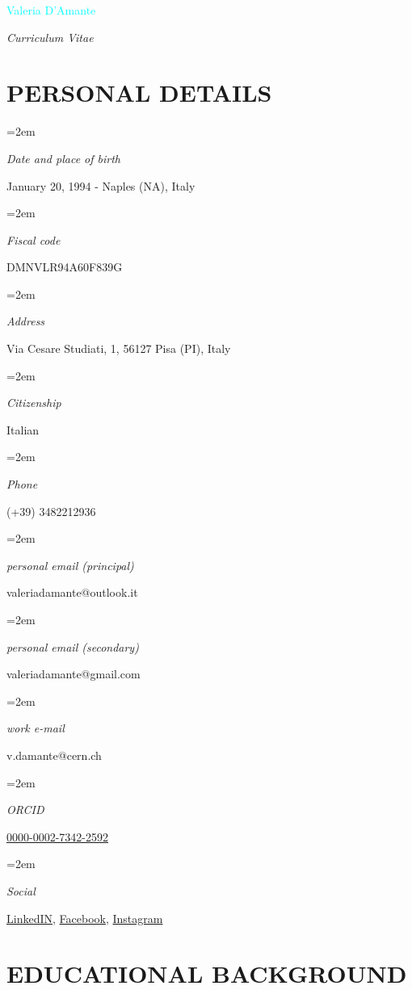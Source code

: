\documentclass[fontsize=12pt]{article} %
\newlength{\spacebox}
\newcommand{\MyName}[1]{ %
	\Huge \hfill \textcolor{cyan}{#1}
	\par \normalsize \normalfont}
\newcommand{\MySlogan}[1]{ %
	\large \hfill \textit{#1}
	\par \normalsize \normalfont}
\newcommand{\NewPart}[1]{\section*{\uppercase{#1}}}
\newcommand{\PersonalEntry}[2]{
	\noindent\hangindent=2em\hangafter=0 %
	\vspace{0.7em}
	\parbox{\spacebox}{        %
		\footnotesize{\textit{#1}}}		       %
	\hspace{1.3em} #2 \par}    %
\begin{document}
	\MyName{Valeria D'Amante}
	\MySlogan{Curriculum Vitae}




	\NewPart{Personal details}
	\PersonalEntry{Date and place of birth}{January 20, 1994 {-} Naples (NA), Italy}
	\PersonalEntry{Fiscal code}{DMNVLR94A60F839G}
	\PersonalEntry{Address}{Via Cesare Studiati, 1, 56127 Pisa (PI), Italy}
	\PersonalEntry{Citizenship}{Italian}
	\PersonalEntry{Phone}{(+39) 3482212936}
	\PersonalEntry{personal e\-mail (principal)}{valeriadamante@outlook.it}
	\PersonalEntry{personal e\-mail (secondary)}{valeriadamante@gmail.com}
	\PersonalEntry{work e-mail}{v.damante@cern.ch}
	\PersonalEntry{ORCID}{\href{https://orcid.org/0000-0002-7342-2592}{0000-0002-7342-2592}}
	\PersonalEntry{Social}{\href{https://www.linkedin.com/in/valeria-d-amante-44943820b/}{LinkedIN}, \href{https://www.facebook.com/Valy.20/}{Facebook}, \href{https://www.instagram.com/valeriadamante/}{Instagram}}

	\NewPart{Educational background}
\end{document}
